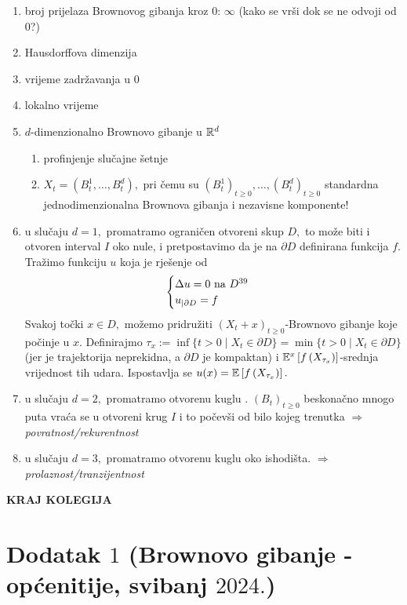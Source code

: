 \documentclass{article}
\begin{document}
\begin{enumerate}
    \item[\ding{113}] broj prijelaza Brownovog gibanja kroz \(0\): \(\infty\) (kako se vrši dok se ne odvoji od \(0\)?)
    \item[\ding{113}] Hausdorffova dimenzija
    \item[\ding{113}] vrijeme zadržavanja u \(0\)
    \item[\ding{113}] lokalno vrijeme
    \item[\ding{113}] \(d\)-dimenzionalno Brownovo gibanje u \(\Bbb R^d\)\begin{enumerate}
        \item[\ding{96}] profinjenje slučajne šetnje
        \item[\ding{96}] \(X_t=(B_t^1,\ldots, B_t^d),\) pri čemu su \((B_t^1)_{t\ge0},\ldots,(B_t^d)_{t\ge0}\) standardna jednodimenzionalna Brownova gibanja i nezavisne komponente!
    \end{enumerate}
    \item[\ding{113}] u slučaju \(d=1,\) promatramo ograničen otvoreni skup \(D,\) to može biti i otvoren interval \(I\) oko nule, i pretpostavimo da je na \(\partial D\) definirana funkcija \(f.\) Tražimo funkciju \(u\) koja je rješenje od \[\begin{cases}\Delta u=0\text{ na }D\footnotemark[39]\\u_{\mid\partial D}=f\end{cases}\] Svakoj točki \(x\in D,\) možemo pridružiti \((X_t+x)_{t\ge0}\)-Brownovo gibanje koje počinje u \(x.\) Definirajmo \(\tau_x:=\inf\{t>0\mid X_t\in\partial D\}=\min\{t>0\mid X_t\in\partial D\}\) (jer je trajektorija neprekidna, a \(\partial D\) je kompaktan) i \(\Bbb E^x\left[f\left(X_{\tau_x}\right)\right]\)-srednja vrijednost tih udara. Ispostavlja se \(u(x)=\Bbb E\left[f\left(X_{\tau_x}\right)\right].\)
    \item[\ding{113}] u slučaju \(d=2,\) promatramo otvorenu kuglu . \((B_t)_{t\ge0}\) beskonačno mnogo puta vraća se u otvoreni krug \(I\) i to počevši od bilo kojeg trenutka \(\Rightarrow\) \emph{povratnost/rekurentnost}
    \item[\ding{113}] u slučaju \(d=3,\) promatramo otvorenu kuglu oko ishodišta. \(\Rightarrow\) \emph{prolaznost/tranzijentnost}
\end{enumerate}
\begin{center}
    \Huge{\textbf{KRAJ KOLEGIJA}}
\end{center}
\newpage
\section{Dodatak \(1\) (Brownovo gibanje - općenitije, svibanj \(2024.\))}
\end{document}
